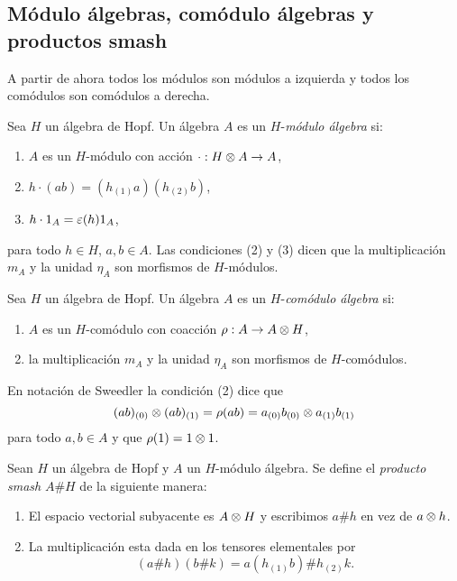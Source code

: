 \documentclass[a4paper,oneside,fleqn,11pt,../tesis.tex]{subfiles}
\begin{document}
\subsection{Módulo álgebras, comódulo álgebras y productos smash}

A partir de ahora todos los módulos son módulos a izquierda y todos los comódulos son comódulos a derecha.

\begin{definition}
	Sea $H$ un álgebra de Hopf. Un álgebra $A$ es un $H$-\emph{módulo álgebra} si:
	\begin{enumerate}[(1)]
		\item $A$ es un $H$-módulo con acción $\cdot: H \otimes A \to A$,
		\item $h \cdot (ab) = (h_{(1)}a)(h_{(2)}b)$,
		\item $h \cdot 1_A = \varepsilon(h)1_A$,
	\end{enumerate}
	para todo $h \in H$, $a, b \in A$.
	Las condiciones (2) y (3) dicen que la multiplicación $m_A$ y la unidad $\eta_A$ son morfismos de $H$-módulos.
\end{definition}

\begin{definition}
	Sea $H$ un álgebra de Hopf. Un álgebra $A$ es un $H$-\emph{comódulo álgebra} si:
	\begin{enumerate}
		\item $A$ es un $H$-comódulo con coacción $\rho: A \to A\otimes H$,
		\item la multiplicación $m_A$ y la unidad $\eta_A$ son morfismos de $H$-comódulos.
	\end{enumerate}
	En notación de Sweedler la condición (2) dice que
	\[
		(ab)_{(0)}\otimes (ab)_{(1)} = \rho(ab) = a_{(0)}b_{(0)} \otimes a_{(1)}b_{(1)}
	\] para todo $a, b \in A$ y que $\rho(1) = 1\otimes 1$.
\end{definition}

\begin{definition}
	Sean $H$ un álgebra de Hopf y $A$ un $H$-módulo álgebra.
	Se define el \emph{producto smash} $A\#H$ de la siguiente manera:
	\begin{enumerate}[(1)]
		\item El espacio vectorial subyacente es $A \otimes H$ y escribimos $a\#h$ en vez de $a\otimes h$.
		\item La multiplicación esta dada en los tensores elementales por
		\[
			(a\#h)(b\#k) = a(h_{(1)}b)\#h_{(2)}k.
		\]
	\end{enumerate}
\end{definition}
\end{document}
